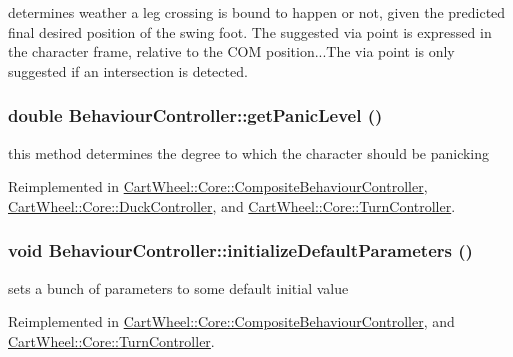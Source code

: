 determines weather a leg crossing is bound to happen or not, given the predicted final desired position of the swing foot. The suggested via point is expressed in the character frame, relative to the COM position...The via point is only suggested if an intersection is detected. \hypertarget{classCartWheel_1_1Core_1_1BehaviourController_aa8e43483e51a9cd697fa33a0674abccc}{
\subsubsection[{getPanicLevel}]{\setlength{\rightskip}{0pt plus 5cm}double BehaviourController::getPanicLevel ()}}
\label{classCartWheel_1_1Core_1_1BehaviourController_aa8e43483e51a9cd697fa33a0674abccc}
this method determines the degree to which the character should be panicking 

Reimplemented in \hyperlink{classCartWheel_1_1Core_1_1CompositeBehaviourController_a103f9b905e00d730a3b07eedad8c491d}{CartWheel::Core::CompositeBehaviourController}, \hyperlink{classCartWheel_1_1Core_1_1DuckController_a987ea7a8efaad0f2e3467970909877a6}{CartWheel::Core::DuckController}, and \hyperlink{classCartWheel_1_1Core_1_1TurnController_ab764c0ea836cc7c58fc7cbe2c8ece882}{CartWheel::Core::TurnController}.

\hypertarget{classCartWheel_1_1Core_1_1BehaviourController_a686bf6e2bc689fef41352eb1fc674884}{
\subsubsection[{initializeDefaultParameters}]{\setlength{\rightskip}{0pt plus 5cm}void BehaviourController::initializeDefaultParameters ()}}
\label{classCartWheel_1_1Core_1_1BehaviourController_a686bf6e2bc689fef41352eb1fc674884}
sets a bunch of parameters to some default initial value 

Reimplemented in \hyperlink{classCartWheel_1_1Core_1_1CompositeBehaviourController_a88c8eed10fb31f94b720e079348446bb}{CartWheel::Core::CompositeBehaviourController}, and \hyperlink{classCartWheel_1_1Core_1_1TurnController_a5a81b94dd968bcf38ae0008608303bf9}{CartWheel::Core::TurnController}.

